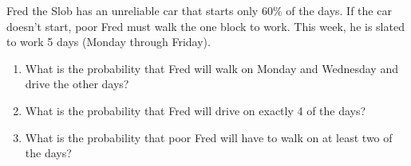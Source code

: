 \documentclass[nooutcomes]{ximera}
\begin{document}
\begin{problem} 
Fred the Slob has an unreliable car that starts only 60\% of the days.
If the car doesn't start, poor Fred must walk the one block to work.
This week, he is slated to work 5 days (Monday through Friday).  
\begin{enumerate}
\item What is the probability that Fred will walk on Monday and Wednesday
and drive the other days?
\item What is the probability that Fred will drive on exactly 4 of the days? 
\item What is the probability that poor Fred will have to walk on at least two of the days?
\end{enumerate}
\end{problem}



\end{document}
